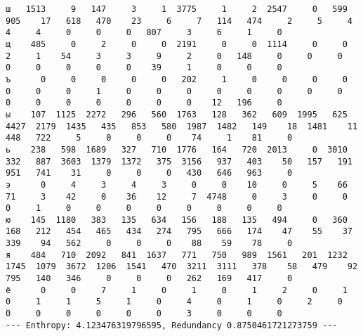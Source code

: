 \documentclass{article}
\begin{document}
\begin{landscape}
\begin{addmargin}{0em}
\begin{verbatim}
ш   1513     9   147     3     1  3775     1     2  2547     0   599   905    17   618   470    23     6     7   114   474     2     5     4     4     4     0     0     0   807     3     6     1     0
щ    485     0     2     0     0  2191     0     0  1114     0     0     2     1    54     3     3     9     2     0   148     0     0     0     0     0     0     0     0    39     1     0     0     0
ъ      0     0     0     0     0   202     1     0     0     0     0     0     0     0     1     0     0     0     0     0     0     0     0     0     0     0     0     0     0     0    12   196     0
ы    107  1125  2272   296   560  1763   128   362   609  1995   625  4427  2179  1435   435   853   580  1987  1482   149    18  1481    11   448   722     5     0     0     0    74     1    81     0
ь    238   598  1689   327   710  1776   164   720  2013     0  3010   332   887  3603  1379  1372   375  3156   937   403    50   157   191   951   741    31     0     0     0   430   646   963     0
э      0     4     3     4     3     0     0    10     0     5    66    71     3    42     0    36    12     7  4748     0     3     0     0     0     1     0     0     0     0     0     0     0     0
ю    145  1180   383   135   634   156   188   135   494     0   360   168   212   454   465   434   274   795   666   174    47    55    37   339    94   562     0     0     0    88    59    78     0
я    484   710  2092   841  1637   771   750   989  1561   201  1232  1745  1079  3672  1206  1541   470  3211  3111   378    58   479    92   795   140   346     0     0     0   262   169   417     0
ё      0     0     7     1     0     1     0     1     2     0     1     0     1     1     5     1     0     4     0     1     0     2     0     0     0     0     0     0     0     3     0     0     0
--- Enthropy: 4.123476319796595, Redundancy 0.8750461721273759 ---
	\end{verbatim}
\end{addmargin}

\end{landscape}
\end{document}
